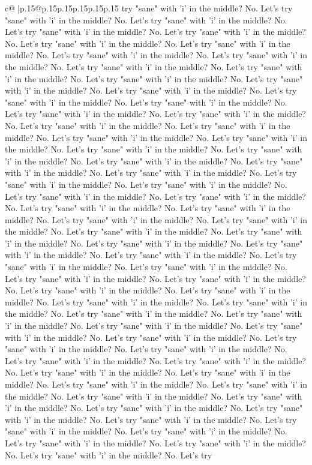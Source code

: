 \documentclass{article}
\begin{document}
{\begin{supertabular}{c@{$\;$}|p{.15\linewidth}@{}p{.15\linewidth}p{.15\linewidth}p{.15\linewidth}p{.15\linewidth}p{.15\linewidth}}
{{{try "sane" with 'i' in the middle? No. Let's try "sane" with 'i' in the middle? No. Let's try "sane" with 'i' in the middle? No. Let's try "sane" with 'i' in the middle? No. Let's try "sane" with 'i' in the middle? No. Let's try "sane" with 'i' in the middle? No. Let's try "sane" with 'i' in the middle? No. Let's try "sane" with 'i' in the middle? No. Let's try "sane" with 'i' in the middle? No. Let's try "sane" with 'i' in the middle? No. Let's try "sane" with 'i' in the middle? No. Let's try "sane" with 'i' in the middle? No. Let's try "sane" with 'i' in the middle? No. Let's try "sane" with 'i' in the middle? No. Let's try "sane" with 'i' in the middle? No. Let's try "sane" with 'i' in the middle? No. Let's try "sane" with 'i' in the middle? No. Let's try "sane" with 'i' in the middle? No. Let's try "sane" with 'i' in the middle? No. Let's try "sane" with 'i' in the middle? No. Let's try "sane" with 'i' in the middle? No. Let's try "sane" with 'i' in the middle? No. Let's try "sane" with 'i' in the middle? No. Let's try "sane" with 'i' in the middle? No. Let's try "sane" with 'i' in the middle? No. Let's try "sane" with 'i' in the middle? No. Let's try "sane" with 'i' in the middle? No. Let's try "sane" with 'i' in the middle? No. Let's try "sane" with 'i' in the middle? No. Let's try "sane" with 'i' in the middle? No. Let's try "sane" with 'i' in the middle? No. Let's try "sane" with 'i' in the middle? No. Let's try "sane" with 'i' in the middle? No. Let's try "sane" with 'i' in the middle? No. Let's try "sane" with 'i' in the middle? No. Let's try "sane" with 'i' in the middle? No. Let's try "sane" with 'i' in the middle? No. Let's try "sane" with 'i' in the middle? No. Let's try "sane" with 'i' in the middle? No. Let's try "sane" with 'i' in the middle? No. Let's try "sane" with 'i' in the middle? No. Let's try "sane" with 'i' in the middle? No. Let's try "sane" with 'i' in the middle? No. Let's try "sane" with 'i' in the middle? No. Let's try "sane" with 'i' in the middle? No. Let's try "sane" with 'i' in the middle? No. Let's try "sane" with 'i' in the middle? No. Let's try "sane" with 'i' in the middle? No. Let's try "sane" with 'i' in the middle? No. Let's try "sane" with 'i' in the middle? No. Let's try "sane" with 'i' in the middle? No. Let's try "sane" with 'i' in the middle? No. Let's try "sane" with 'i' in the middle? No. Let's try "sane" with 'i' in the middle? No. Let's try "sane" with 'i' in the middle? No. Let's try "sane" with 'i' in the middle? No. Let's try "sane" with 'i' in the middle? No. Let's try "sane" with 'i' in the middle? No. Let's try "sane" with 'i' in the middle? No. Let's try "sane" with 'i' in the middle? No. Let's try "sane" with 'i' in the middle? No. Let's try "sane" with 'i' in the middle? No. Let's try "sane" with 'i' in the middle? No. Let's try "sane" with 'i' in the middle? No. Let's try "sane" with 'i' in the middle? No. Let's try "sane" with 'i' in the middle? No. Let's try "sane" with 'i' in the middle? No. Let's try "sane" with 'i' in the middle? No. Let's try "sane" with 'i' in the middle? No. Let's try "sane" with 'i' in the middle? No. Let's try "sane" with 'i' in the middle? No. Let's try }}}
\end{supertabular}}
\end{document}
